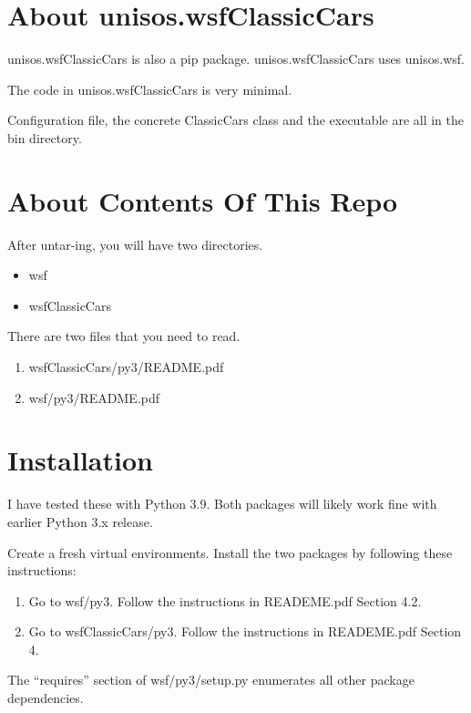\documentclass{article}
\begin{document}
\section{About unisos.wsfClassicCars}

unisos.wsfClassicCars is also a pip package.
unisos.wsfClassicCars uses unisos.wsf.

The code in unisos.wsfClassicCars is very minimal.

Configuration file, the concrete ClassicCars class and the executable are all in the bin directory.

\section{About Contents Of This Repo}

After untar-ing, you will have two directories.

\begin{itemize}
  \item wsf
  \item wsfClassicCars
\end{itemize}

There are two files that you need to read.

\begin{enumerate}
  \item wsfClassicCars/py3/README.pdf
  \item wsf/py3/README.pdf
\end{enumerate}

\section{Installation}

I have tested these with Python 3.9.
Both packages will likely work fine with earlier Python 3.x release.

Create a fresh virtual environments. Install the two packages by
following these instructions:

\begin{enumerate}
  \item Go to wsf/py3. Follow the instructions in READEME.pdf Section 4.2.
  \item Go to wsfClassicCars/py3. Follow the instructions in READEME.pdf Section 4.
\end{enumerate}

The ``requires'' section of wsf/py3/setup.py enumerates all other
package dependencies.
\end{document}
